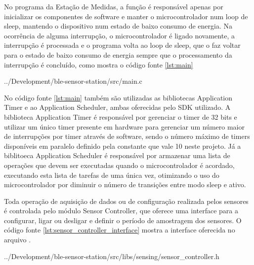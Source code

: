 No programa da Estação de Medidas, a função  é responsável apenas
por inicializar os componentes de software e manter o microcontrolador num loop
de sleep, mantendo o dispositivo num estado de baixo consumo de energia. Na
ocorrência de alguma interrupção, o microcontrolador é ligado novamente, a
interrupção é processada e o programa volta ao loop de sleep, que o faz voltar
para o estado de baixo consumo de energia sempre que o processamento da
interrupção é concluído, como mostra o código fonte \ref{lst:main}

\begin{minipage}{0.95\linewidth}  

{../Development/ble-sensor-station/src/main.c}
\end{minipage}

No código fonte \ref{lst:main} também são utilizadas as bibliotecas Application
Timer e ao Application Scheduler, ambas oferecidas pelo SDK utilizado. A
biblioteca Application Timer é responsável por gerenciar o timer de 32 bits e
utilizar um único timer presente em hardware para gerenciar um número maior de
interrupções por timer através de software, sendo o número máximo de timers
disponíveis em paralelo definido pela constante
 que vale 10 neste projeto. Já a
biblitoeca Application Scheduler é responsável por armazenar uma lista de
operações que devem ser executadas quando o microcontrolador é acordado,
executando esta lista de tarefas de uma única vez, otimizando o uso do
microcontrolador por diminuir o número de transições entre modo sleep e ativo.


Toda operação de aquisição de dados ou de configuração realizada pelos sensores
é controlada pelo módulo Sensor Controller, que oferece uma interface para a
configurar, ligar ou desligar e definir o período de amostragem dos sensores. O
código fonte \ref{lst:sensor_controller_interface} mostra a interface oferecida
no arquivo .
 
\begin{minipage}{0.95\linewidth} 

{../Development/ble-sensor-station/src/libs/sensing/sensor_controller.h}
\end{minipage}


